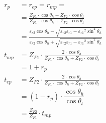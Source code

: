 \begin{align*}
    r_p    & =  r_{ep} = r_{mp} =                                                                                                                                                                                                        \\
           & = \frac{Z_{F1} \cdot \cos \theta_h-Z_{F2} \cdot \cos \theta_t}{Z_{F1} \cdot \cos \theta_h+Z_{F2} \cdot \cos \theta_t}                                                                                                       \\
           & = \frac{\varepsilon_{r2}\cos\theta_h-\sqrt{\varepsilon_{r2}\varepsilon_{r1}-{\varepsilon_{r1}}^2\sin^2\theta_h}}{\varepsilon_{r2}\cos\theta_h+\sqrt{{\varepsilon_{r2}\varepsilon_{r1}-{\varepsilon_{r1}}^2\sin^2\theta_h}}} \\
    t_{mp} & = Z_{F1} \cdot \frac{2 \cdot \cos \theta_h}{Z_{F1} \cdot \cos \theta_h+Z_{F2} \cdot \cos \theta_t}                                                                                                                          \\
           & = 1+r_p                                                                                                                                                                                                                     \\
    t_{ep} & = Z_{F2} \cdot \frac{2 \cdot \cos \theta_h}{Z_{F1} \cdot \cos \theta_h+Z_{F2} \cdot \cos \theta_t}                                                                                                                          \\
           & = (1-r_p) \cdot \dfrac{\cos \theta_h}{\cos \theta_t}                                                                                                                                                                        \\
           & = \frac{Z_{F2}}{Z_{F1}}\cdot t_{mp}
\end{align*}


